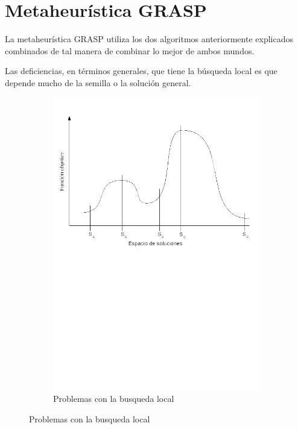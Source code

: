 \section{Metaheur\'istica GRASP}

La metaheur\'istica GRASP utiliza los dos algoritmos anteriormente explicados combinados de tal manera de combinar lo mejor de ambos mundos.

Las deficiencias, en t\'erminos generales, que tiene la b\'usqueda local es que depende mucho de la semilla o la soluci\'on general.

\begin{figure}[H]
        \centering
        \begin{subfigure}[b]{0.7\textwidth}
                \includegraphics[width=\textwidth]{ej5/local1.png}
                \caption{Problemas con la busqueda local}
                \label{fig:prob_con_bl}
        \end{subfigure}%
\end{figure}

